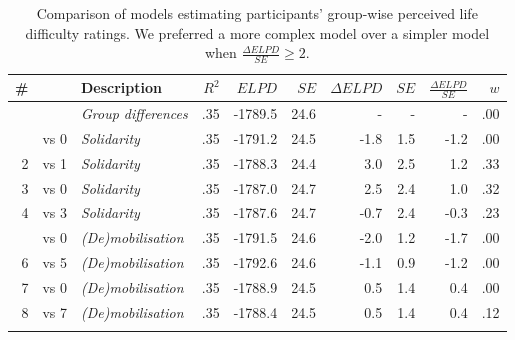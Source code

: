 \documentclass[12pt, a4paper]{article}
\begin{document}
\begin{table}
\centering
{}
\caption{
Comparison of models estimating participants' group-wise perceived life difficulty ratings. We preferred a more complex model over a simpler model when $\frac{\Delta\textit{ELPD}}{\textit{SE}} \geq 2$.
}
\small	
\begin{tabularx}{\linewidth}{r@{~}rXrrrrrrr} \toprule
\# &  &  Description & $R^2$ & $\textit{ELPD}$ & $\textit{SE}$ & $\Delta\textit{ELPD}$ & $\textit{SE}$ & $\frac{\Delta\textit{ELPD}}{\textit{SE}}$ & $w$ \\ \midrule \addlinespace
0 &      & \textit{Group differences} & .35 & -1789.5 & 24.6 & - & - & - & .00 \\ \addlinespace
1 & vs 0 & \textit{Solidarity}       & .35 & -1791.2 & 24.5 & -1.8 & 1.5 & -1.2 & .00 \\
2 & vs 1 & \textit{Solidarity}       & .35 & -1788.3 & 24.4 & 3.0 & 2.5 & 1.2 & .33 \\
3 & vs 0 & \textit{Solidarity}       & .35 & -1787.0 & 24.7 & 2.5 & 2.4 & 1.0 & .32 \\
4 & vs 3 & \textit{Solidarity}       & .35 & -1787.6 & 24.7 & -0.7 & 2.4 & -0.3 & .23 \\ \addlinespace
5 & vs 0 & \textit{(De)mobilisation} & .35 & -1791.5 & 24.6 & -2.0 & 1.2 & -1.7 & .00 \\
6 & vs 5 & \textit{(De)mobilisation} & .35 & -1792.6 & 24.6 & -1.1 & 0.9 & -1.2 & .00 \\
7 & vs 0 & \textit{(De)mobilisation} & .35 & -1788.9 & 24.5 & 0.5 & 1.4 & 0.4 & .00 \\
8 & vs 7 & \textit{(De)mobilisation} & .35 & -1788.4 & 24.5 & 0.5 & 1.4 & 0.4 & .12 \\ \addlinespace \bottomrule
\end{tabularx}
\label{tab:d-2}
\end{table}
\end{document}
